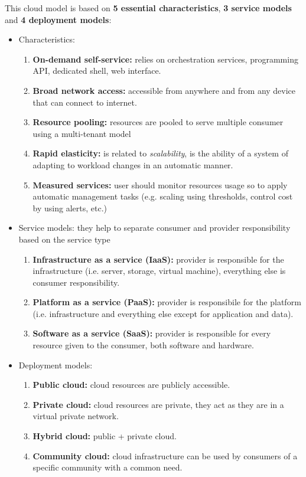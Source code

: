 \documentclass{article}
\begin{document}
This cloud model is based on \textbf{5 essential characteristics}, \textbf{3 service models} and \textbf{4 deployment models}:
\begin{itemize}
    \item Characteristics:
    \begin{enumerate}
        \item \textbf{On-demand self-service:} relies on orchestration services, programming API, dedicated shell, web interface.
        \item \textbf{Broad network access:} accessible from anywhere and from any device that can connect to internet.
        \item \textbf{Resource pooling:} resources are pooled to serve multiple consumer using a multi-tenant model
        \item \textbf{Rapid elasticity:} is related to \textit{scalability}, is the ability of a system of adapting to workload changes in an automatic manner.
        \item \textbf{Measured services:} user should monitor resources usage so to apply automatic management tasks (e.g. scaling using thresholds, control cost by using alerts, etc.)
    \end{enumerate}
    \item Service models: they help to separate consumer and provider responsibility based on the service type
    \begin{enumerate}
        \item \textbf{Infrastructure as a service (IaaS):} provider is responsible for the infrastructure (i.e. server, storage, virtual machine), everything else is consumer responsibility.
        \item \textbf{Platform as a service (PaaS):} provider is responsibile for the platform (i.e. infrastructure and everything else except for application and data).
        \item \textbf{Software as a service (SaaS):} provider is responsible for every resource given to the consumer, both software and hardware.
    \end{enumerate}
    \item Deployment models:
    \begin{enumerate}
        \item \textbf{Public cloud:} cloud resources are publicly accessible.
        \item \textbf{Private cloud:} cloud resources are private, they act as they are in a virtual private network.
        \item \textbf{Hybrid cloud:} public + private cloud.
        \item \textbf{Community cloud:} cloud infrastructure can be used by consumers of a specific community with a common need.
    \end{enumerate}
\end{itemize}
\end{document}
